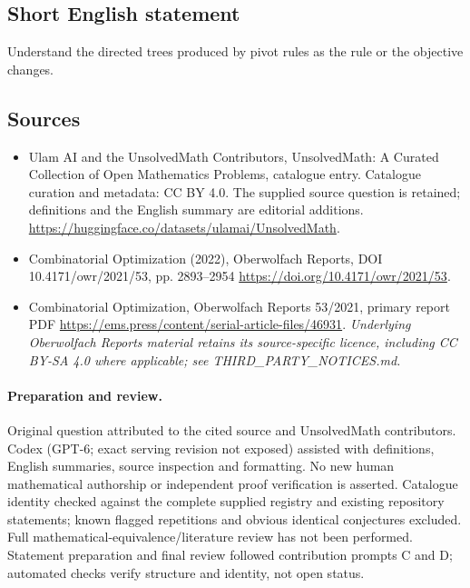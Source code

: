 \documentclass[11pt]{article}
\begin{document}
\subsection{Short English statement}
Understand the directed trees produced by pivot rules as the rule or the objective changes.
\subsection{Sources}
\begin{itemize}
\item[\hypertarget{source:statement:1}{S1}] Ulam AI and the UnsolvedMath Contributors, UnsolvedMath: A Curated Collection of Open Mathematics Problems, catalogue entry. Catalogue curation and metadata: CC BY 4.0. The supplied source question is retained; definitions and the English summary are editorial additions.
\url{https://huggingface.co/datasets/ulamai/UnsolvedMath}.
\item[\hypertarget{source:statement:2}{S2}] Combinatorial Optimization (2022), Oberwolfach Reports, DOI 10.4171/owr/2021/53, pp. 2893--2954
\url{https://doi.org/10.4171/owr/2021/53}.
\item[\hypertarget{source:statement:3}{S3}] Combinatorial Optimization, Oberwolfach Reports 53/2021, primary report PDF
\url{https://ems.press/content/serial-article-files/46931}.
\textit{Underlying Oberwolfach Reports material retains its source-specific licence, including CC BY-SA 4.0 where applicable; see THIRD\_PARTY\_NOTICES.md.}
\end{itemize}
\paragraph{Preparation and review.}
Original question attributed to the cited source and UnsolvedMath contributors. Codex (GPT-6; exact serving revision not exposed) assisted with definitions, English summaries, source inspection and formatting. No new human mathematical authorship or independent proof verification is asserted. Catalogue identity checked against the complete supplied registry and existing repository statements; known flagged repetitions and obvious identical conjectures excluded. Full mathematical-equivalence/literature review has not been performed. Statement preparation and final review followed contribution prompts C and D; automated checks verify structure and identity, not open status.
\label{end:statement}
\end{document}
